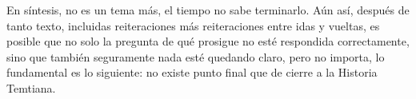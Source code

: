 \documentclass[
]{book}
\begin{document}
En síntesis, no es un tema más, el tiempo no sabe terminarlo. Aún así, después de tanto texto, incluidas reiteraciones más reiteraciones entre idas y vueltas, es posible que no solo la pregunta de qué prosigue no esté respondida correctamente, sino que también seguramente nada esté quedando claro, pero no importa, lo fundamental es lo siguiente: no existe punto final que de cierre a la Historia Temtiana.
\end{document}
